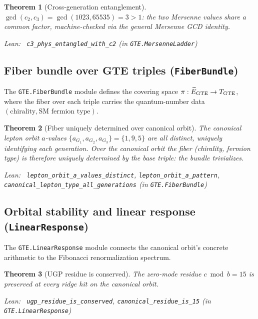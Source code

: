 \documentclass[11pt,a4paper]{article}
\newenvironment{leanref}%
  {\par\smallskip\noindent\begingroup\raggedright\textup{Lean:}~}%
  {\par\endgroup}
\newtheorem{theorem}{Theorem}[section]
\theoremstyle{definition}
\begin{document}
\begin{theorem}[Cross-generation entanglement]\label{thm:c-entangle}
$\gcd(c_2, c_3) = \gcd(1023, 65535) = 3 > 1$: the two Mersenne
values share a common factor, machine-checked via the general
Mersenne GCD identity.

\begin{leanref} \lstinline|c3_phys_entangled_with_c2|
\textup{(in \texttt{GTE.MersenneLadder})}
\end{leanref}
\end{theorem}

\subsection{Fiber bundle over GTE triples (\texttt{FiberBundle})}\label{subsec:fiberbundle}

The \texttt{GTE.FiberBundle} module defines the covering space
$\pi: \widetilde{E}_{\rm GTE} \to T_{\rm GTE}$, where the fiber
over each triple carries the quantum-number data
$(\text{chirality}, \text{SM fermion type})$.

\begin{theorem}[Fiber uniquely determined over canonical orbit]\label{thm:fiber-trivial}
The canonical lepton orbit $a$-values $\{a_{G_1}, a_{G_2}, a_{G_3}\} = \{1, 9, 5\}$
are all distinct, uniquely identifying each generation.  Over the canonical orbit
the fiber (chirality, fermion type) is therefore uniquely determined by the base triple:
the bundle trivializes.

\begin{leanref} \lstinline|lepton_orbit_a_values_distinct|,
\lstinline|lepton_orbit_a_pattern|,
\lstinline|canonical_lepton_type_all_generations|
\textup{(in \texttt{GTE.FiberBundle})}
\end{leanref}
\end{theorem}

\subsection{Orbital stability and linear response (\texttt{LinearResponse})}\label{subsec:linear-response}

The \texttt{GTE.LinearResponse} module connects the canonical orbit's concrete
arithmetic to the Fibonacci renormalization spectrum.

\begin{theorem}[UGP residue is conserved]\label{thm:residue-conserved}
The zero-mode residue $c \bmod b = 15$ is preserved at every ridge hit on the
canonical orbit.

\begin{leanref} \lstinline|ugp_residue_is_conserved|,
\lstinline|canonical_residue_is_15|
\textup{(in \texttt{GTE.LinearResponse})}
\end{leanref}
\end{theorem}
\end{document}
